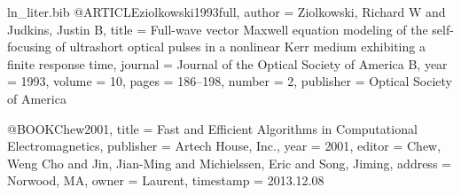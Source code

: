 \begin{filecontents*}{ln_liter.bib}
@ARTICLE{ziolkowski1993full,
  author = {Ziolkowski, Richard W and Judkins, Justin B},
  title = {Full-wave vector {{M}axwell} equation modeling of the self-focusing
	of ultrashort optical pulses in a nonlinear {Kerr} medium exhibiting
	a finite response time},
  journal = {Journal of the Optical Society of America B},
  year = {1993},
  volume = {10},
  pages = {186--198},
  number = {2},
  publisher = {Optical Society of America}
}

@BOOK{Chew2001,
  title = {Fast and Efficient Algorithms in Computational Electromagnetics},
  publisher = {Artech House, Inc.},
  year = {2001},
  editor = {Chew, Weng Cho and Jin, Jian-Ming and Michielssen, Eric and Song,
	Jiming},
  address = {Norwood, MA},
  owner = {Laurent},
  timestamp = {2013.12.08}
}


\end{filecontents*}

\documentclass[14pt, a4paper]{extbook}%

\usepackage{geometry}
\geometry{
	showframe=false,
	a4paper,
	twoside=true,
	top=3cm,
	bottom=3cm,
	left=30mm,
	right=30mm,
	heightrounded,
	bindingoffset=0mm
}
\usepackage[english]{babel}
\usepackage[bitstream-charter]{mathdesign}
\renewcommand{\footnotesize}{\small} 

\usepackage{fancyhdr}
\pagestyle{fancy}
\fancyhead{}%
\fancyfoot{}%
\renewcommand{\headrulewidth}{0pt}%
\fancyfoot[RO, LE]{\centering \thepage}


\usepackage{pdfpages}
\usepackage[noabbrv,ugly]{unitsdef}
\usepackage{hyperref}
\usepackage{indentfirst}
\usepackage[noadjust]{cite}
\renewcommand{\baselinestretch}{1.2} 
\usepackage{color}
\usepackage{soul}
\newcommand{\add}[1]{
  \textcolor{blue}{#1}
}
\newcommand{\remove}[1]{
  \textcolor{red}{\st{#1}}
}


